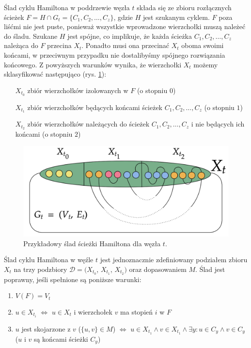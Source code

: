 \documentclass[12pt, oneside]{report}
\begin{document}
Ślad cyklu Hamiltona w poddrzewie węzła $t$ składa się ze zbioru rozłącznych ścieżek $F = H \cap G_t = \{C_1, C_2, \ldots, C_z\}$, gdzie $H$ jest szukanym cyklem. $F$ poza liśćmi nie jest puste, ponieważ wszystkie wprowadzone wierzchołki muszą należeć do śladu. Szukane $H$ jest spójne, co implikuje, że każda ścieżka $C_1, C_2, \ldots, C_z$ należąca do $F$ przecina $X_t$. Ponadto musi ona przecinać $X_t$ oboma swoimi końcami, w przeciwnym przypadku nie dostalibyśmy spójnego rozwiązania końcowego. Z powyższych warunków wynika, że wierzchołki $X_t$ możemy sklasyfikować następująco (rys. \ref{hamiltonian}):
\begin{itemize}[noitemsep,topsep=5pt,parsep=0pt,partopsep=0pt]
\item[$X_{t_0}$] zbiór wierzchołków izolowanych w $F$ (o stopniu $0$)
\item[$X_{t_1}$] zbiór wierzchołków będących końcami ścieżek $C_1, C_2, \ldots, C_z$ (o stopniu $1$)
\item[$X_{t_2}$] zbiór wierzchołków należących do ścieżek $C_1, C_2, \ldots, C_z$ i nie będących ich końcami (o stopniu $2$)
\end{itemize}

\begin{figure}
\centering
\includegraphics[width=16cm]{hamiltonian.png}
\caption{Przykładowy ślad ścieżki Hamiltona dla węzła $t$.}
\label{hamiltonian}
\end{figure}

Ślad cyklu Hamiltona w węźle $t$ jest jednoznacznie zdefiniowany podziałem zbioru $X_t$ na trzy podzbiory $\mathcal{D} = (X_{t_0}$, $X_{t_1}$, $X_{t_2})$ oraz dopasowaniem $M$. Ślad jest poprawny, jeśli spełnione są poniższe warunki:
\begin{enumerate}[label=(\roman*)]
\item $V(F) = V_t$
\item $u \in X_{t_i}$ $\Leftrightarrow$ $u \in X_t$ i wierzchołek $v$ ma stopień $i$ w $F$
\item $u$ jest skojarzone z $v$ ($\{u, v\} \in M$) $\Leftrightarrow$ $u \in X_{t_1} \wedge v \in X_{t_1} \wedge \exists y: u \in C_y \wedge v \in C_y$ ($u$ i $v$ są końcami ścieżki $C_y$) 
\end{enumerate}  
\end{document}
